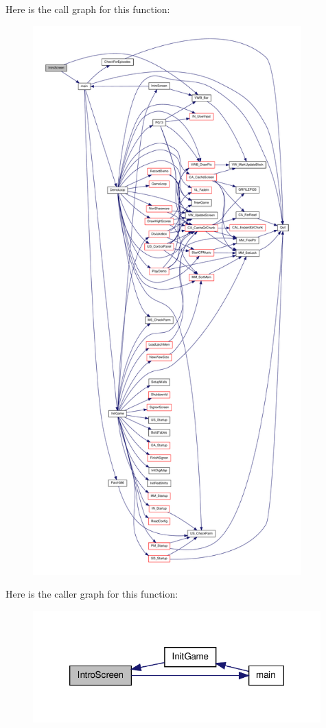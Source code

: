 Here is the call graph for this function:
\nopagebreak
\begin{figure}[H]
\begin{center}
\leavevmode
\includegraphics[height=600pt]{WL__MENU_8C_a98260bc22d24f0075ec75a375a865b1d_cgraph}
\end{center}
\end{figure}




Here is the caller graph for this function:
\nopagebreak
\begin{figure}[H]
\begin{center}
\leavevmode
\includegraphics[width=314pt]{WL__MENU_8C_a98260bc22d24f0075ec75a375a865b1d_icgraph}
\end{center}
\end{figure}


